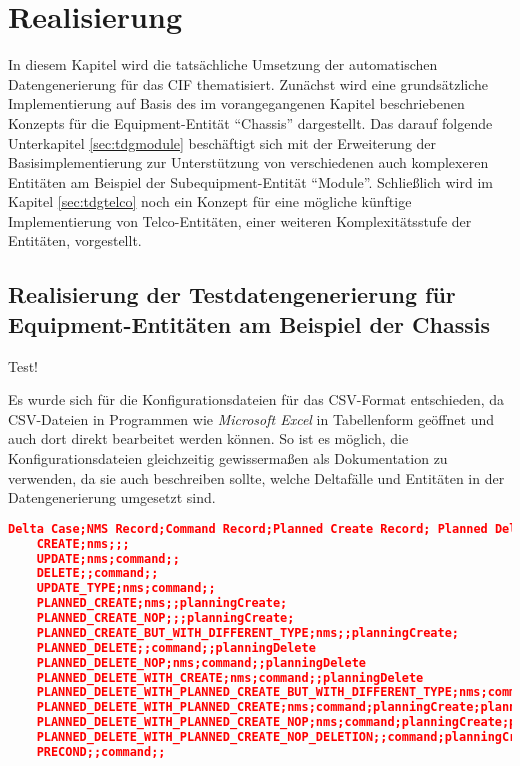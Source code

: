 \chapter{Realisierung}\label{ch:realisierung}
In diesem Kapitel wird die tatsächliche Umsetzung der automatischen Datengenerierung für das \ac{CIF} thematisiert. Zunächst wird eine grundsätzliche Implementierung auf Basis des im vorangegangenen Kapitel beschriebenen Konzepts für die Equipment-Entität \enquote{Chassis} dargestellt. Das darauf folgende Unterkapitel \ref{sec:tdgmodule} beschäftigt sich mit der Erweiterung der Basisimplementierung zur Unterstützung von verschiedenen auch komplexeren Entitäten am Beispiel der Subequipment-Entität \enquote{Module}. Schließlich wird im Kapitel \ref{sec:tdgtelco} noch ein Konzept für eine mögliche künftige Implementierung von Telco-Entitäten, einer weiteren Komplexitätsstufe der Entitäten, vorgestellt.

\section{Realisierung der Testdatengenerierung für Equipment-Entitäten am Beispiel der Chassis}\label{sec:tdgchassis}
Test!

Es wurde sich für die Konfigurationsdateien für das \ac{CSV}-Format entschieden, da \ac{CSV}-Dateien in Programmen wie \textit{Microsoft Excel} in Tabellenform geöffnet und auch dort direkt bearbeitet werden können. \cite{excel:2022} So ist es möglich, die Konfigurationsdateien gleichzeitig gewissermaßen als Dokumentation zu verwenden, da sie auch beschreiben sollte, welche Deltafälle und Entitäten in der Datengenerierung umgesetzt sind.


\begin{lstlisting}[caption=Konfigurationsdatei für Deltafälle im CSV-Format, label=Delta-Spezifikationen,language=json]
    Delta Case;NMS Record;Command Record;Planned Create Record; Planned Delete Record
    CREATE;nms;;;
    UPDATE;nms;command;;
    DELETE;;command;;
    UPDATE_TYPE;nms;command;;
    PLANNED_CREATE;nms;;planningCreate;
    PLANNED_CREATE_NOP;;;planningCreate;
    PLANNED_CREATE_BUT_WITH_DIFFERENT_TYPE;nms;;planningCreate;
    PLANNED_DELETE;;command;;planningDelete
    PLANNED_DELETE_NOP;nms;command;;planningDelete
    PLANNED_DELETE_WITH_CREATE;nms;command;;planningDelete
    PLANNED_DELETE_WITH_PLANNED_CREATE_BUT_WITH_DIFFERENT_TYPE;nms;command;planningCreate;planningDelete
    PLANNED_DELETE_WITH_PLANNED_CREATE;nms;command;planningCreate;planningDelete
    PLANNED_DELETE_WITH_PLANNED_CREATE_NOP;nms;command;planningCreate;planningDelete
    PLANNED_DELETE_WITH_PLANNED_CREATE_NOP_DELETION;;command;planningCreate;planningDelete
    PRECOND;;command;;
\end{lstlisting}

